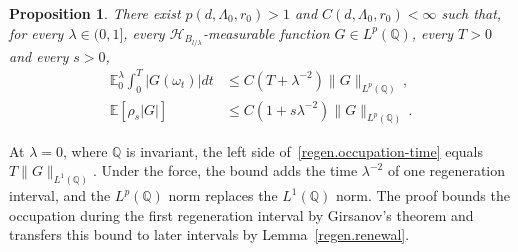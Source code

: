 \documentclass[11pt]{amsart}
\newtheorem{proposition}{Proposition}[section]
\theoremstyle{definition}
\theoremstyle{remark}
\numberwithin{equation}{section}
\newcommand{\E}{\mathbb E}
\newcommand{\Q}{\mathbb Q}
\begin{document}
\begin{proposition}\label{regen.occupation}
There exist $p(d,\Lambda_0,r_0)>1$ and $C(d,\Lambda_0,r_0)<\infty$ such that, for every $\lambda\in(0,1]$, every $\mathcal H_{B_{l/\lambda}}$-measurable function $G\in L^p(\Q)$, every $T>0$ and every $s>0$,
\begin{align}
 \mathbb E^\lambda_0\int_0^T|G(\omega_t)|dt
 &\leq C(T+\lambda^{-2})\|G\|_{L^p(\Q)}\, ,\label{regen.occupation-time}\\
 \E[\rho_s|G|]
 &\leq C(1+s\lambda^{-2})\|G\|_{L^p(\Q)}\, .\label{regen.occupation-resolvent}
\end{align}
\end{proposition}

At $\lambda=0$, where $\Q$ is invariant, the left side of~\eqref{regen.occupation-time} equals $T\|G\|_{L^1(\Q)}$. Under the force, the bound adds the time $\lambda^{-2}$ of one regeneration interval, and the $L^p(\Q)$ norm replaces the $L^1(\Q)$ norm. The proof bounds the occupation during the first regeneration interval by Girsanov's theorem and transfers this bound to later intervals by Lemma~\ref{regen.renewal}.
\end{document}
